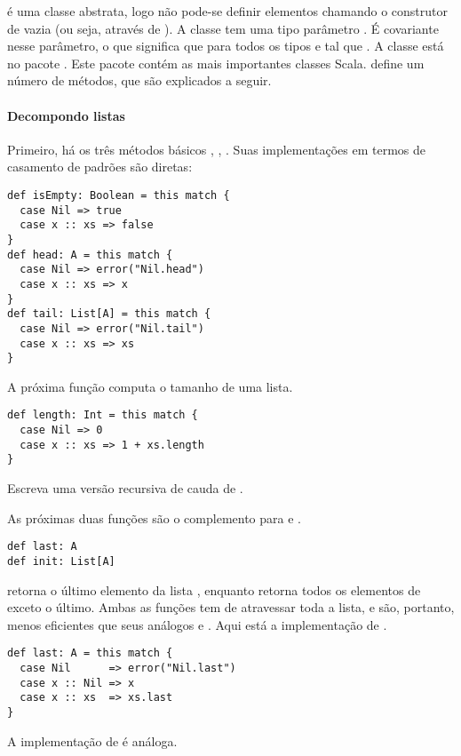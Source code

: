  é uma classe abstrata, logo não pode-se definir elementos 
chamando o construtor de  vazia (ou seja, através de ).
A classe tem uma tipo parâmetro . É covariante nesse parâmetro, o que 
significa que  para todos os tipos  e  tal que 
. A classe está no pacote . Este pacote contém as mais 
importantes classes Scala.  define um número de métodos, que são explicados a seguir.

\paragraph{Decompondo listas}
Primeiro, há os três métodos básicos , , .
Suas implementações em termos de casamento de padrões são diretas:
\begin{lstlisting}
def isEmpty: Boolean = this match {
  case Nil => true
  case x :: xs => false
}
def head: A = this match {
  case Nil => error("Nil.head")
  case x :: xs => x
}
def tail: List[A] = this match {
  case Nil => error("Nil.tail")
  case x :: xs => xs
}
\end{lstlisting}

A próxima função computa o tamanho de uma lista.
\begin{lstlisting}
def length: Int = this match {
  case Nil => 0
  case x :: xs => 1 + xs.length
}
\end{lstlisting}
\begin{exercise} Escreva uma versão recursiva de cauda de .
\end{exercise}

As próximas duas funções são o complemento para  e .
\begin{lstlisting}
def last: A
def init: List[A]
\end{lstlisting}

 retorna o último elemento da lista , enquanto 
 retorna todos os elementos de  exceto o último.
Ambas as funções tem de atravessar toda a lista, e são, portanto, menos 
eficientes que seus análogos  e .
Aqui está a implementação de .
\begin{lstlisting}
def last: A = this match {
  case Nil      => error("Nil.last")
  case x :: Nil => x
  case x :: xs  => xs.last
}
\end{lstlisting}
A implementação de  é análoga.

